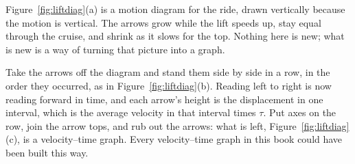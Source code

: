 \documentclass[11pt,twoside,openany]{book}
\begin{document}
Figure~\ref{fig:liftdiag}(a) is a motion diagram for the ride, drawn vertically because the motion is vertical. The arrows grow while the lift speeds up, stay equal through the cruise, and shrink as it slows for the top. Nothing here is new; what is new is a way of turning that picture into a graph.

Take the arrows off the diagram and stand them side by side in a row, in the order they occurred, as in Figure~\ref{fig:liftdiag}(b). Reading left to right is now reading forward in time, and each arrow's height is the displacement in one interval, which is the average velocity in that interval times $\tau$. Put axes on the row, join the arrow tops, and rub out the arrows: what is left, Figure~\ref{fig:liftdiag}(c), is a velocity--time graph. Every velocity--time graph in this book could have been built this way.
\end{document}
